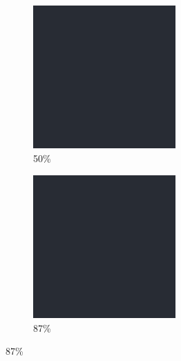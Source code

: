 \documentclass[12pt, fleqn]{report}                             %
\theoremstyle{break}                                            %
\begin{document}
\begin{figure}[ht!]
\begin{subfigure}[b]{0.4\linewidth}
          \includegraphics[width=0.6\textwidth]{Images/0/c.png}
          \caption{50\%}
        \end{subfigure}
        \begin{subfigure}[b]{0.4\linewidth}
          \includegraphics[width=0.6\textwidth]{Images/0/d.png}
          \caption{87\%}
        \end{subfigure}
      \end{figure}
\end{document}
